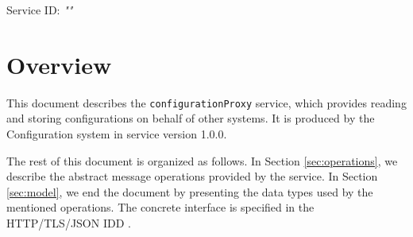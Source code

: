 \documentclass[a4paper]{arrowhead}
\begin{document}
\sloppy

\ArrowheadSetup

\begin{center}
  \vspace*{1cm}
  \huge{\arrowtitle}

  \vspace*{0.2cm}
  \LARGE{\arrowtype}
  \vspace*{1cm}

  \Large{Service ID: \textit{"\arrowid"}}

  \vspace*{\fill}


  \vspace*{1cm}
  \vspace*{\fill}

  \begin{abstract}
    This document describes the \texttt{configurationProxy} service, version 1.0.0, produced by the Configuration support system of Arrowhead 5.2.2.
  \end{abstract}

  \vspace*{1cm}
\end{center}

\newpage

\tableofcontents
\newpage

\section{Overview}
\label{sec:overview}

This document describes the \texttt{configurationProxy} service, which provides reading and storing configurations on behalf of other systems.
It is produced by the Configuration system \cite{cfg-sysd} in service version 1.0.0.

The rest of this document is organized as follows.
In Section \ref{sec:operations}, we describe the abstract message operations provided by the service.
In Section \ref{sec:model}, we end the document by presenting the data types used by the mentioned operations.
The concrete interface is specified in the HTTP/TLS/JSON IDD \cite{cfg-configurationProxy-http-idd}.
\end{document}
